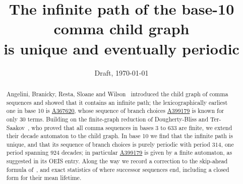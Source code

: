 \documentclass[11pt,a4paper]{article}
\title{The infinite path of the base-10 comma child graph\\ is unique and eventually periodic}
\author{\todo{authors}}
\date{Draft, \today}
\theoremstyle{definition}
\theoremstyle{remark}
\newcommand{\oeis}[1]{\href{https://oeis.org/#1}{#1}}
\begin{document}
\maketitle

\begin{abstract}
  Angelini, Branicky, Resta, Sloane and Wilson~\cite{comma} introduced the child graph of comma
  sequences and showed that it contains an infinite path; the lexicographically earliest one in
  base 10 is \oeis{A367620}, whose sequence of branch choices \oeis{A399179} is known for only
  30 terms. Building on the finite-graph reduction of Dougherty-Bliss and Ter-Saakov~\cite{dbts},
  who proved that all comma sequences in bases 3 to 633 are finite, we extend their decade
  automaton to the child graph. In base 10 we find that the infinite path is unique, and that its
  sequence of branch choices is purely periodic with period $314$, one period spanning $924$
  decades; in particular \oeis{A399179} is given by a finite automaton, as suggested in its OEIS
  entry. Along the way we record a correction to the skip-ahead formula of~\cite{comma}, and exact
  statistics of where successor sequences end, including a closed form for their mean lifetime.
\end{abstract}











\appendix




\end{document}
